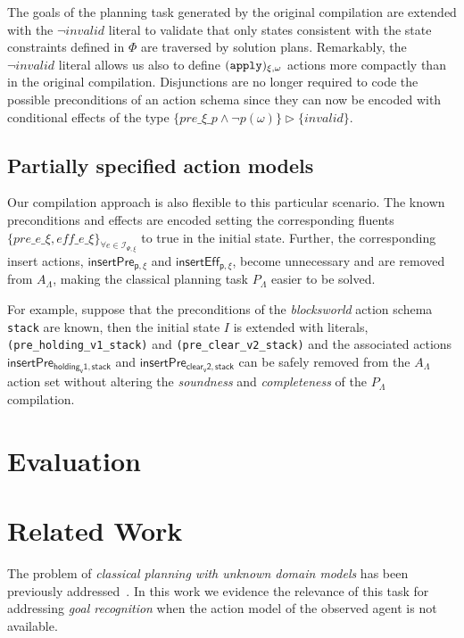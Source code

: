 \documentclass[letterpaper]{article} %
\begin{document}
The goals of the planning task generated by the original compilation are extended with the $\neg invalid$ literal to validate that only states consistent with the state constraints defined in $\Phi$ are traversed by solution plans. Remarkably, the $\neg invalid$ literal allows us also to define ${\tt \small (apply)_{\xi,\omega}}$ actions more compactly than in the original compilation. Disjunctions are no longer required to code the possible preconditions of an action schema since they can now be encoded with conditional effects of the type $\{pre\_\xi\_p\wedge \neg p(\omega)\}\rhd\{invalid\}$.


\subsection{Partially specified action models}
Our compilation approach is also flexible to this particular scenario. The known preconditions and effects are encoded setting the corresponding fluents $\{pre\_e\_\xi, eff\_e\_\xi\}_{\forall e\in{\mathcal I}_{\Psi,\xi}}$ to true in the initial state. Further, the corresponding insert actions, $\mathsf{insertPre_{p,\xi}}$ and $\mathsf{insertEff_{p,\xi}}$, become unnecessary and are removed from $A_{\Lambda}$, making the classical planning task $P_{\Lambda}$ easier to be solved.

For example, suppose that the preconditions of the {\em blocksworld} action schema {\tt stack} are known, then the initial state $I$ is extended with literals, {\small\tt(pre\_holding\_v1\_stack)} and {\small\tt(pre\_clear\_v2\_stack)} and the associated actions $\mathsf{insertPre_{holding_v1,stack}}$ and $\mathsf{insertPre_{clear_v2,stack}}$ can be safely removed from the $A_{\Lambda}$ action set without altering the {\em soundness} and {\em completeness} of the $P_{\Lambda}$ compilation.
















\section{Evaluation}
\label{sec:evaluation}

\section{Related Work}
\label{sec:evaluation}
The problem of {\em classical planning with unknown domain models} has been previously addressed~\cite{SternJ17}. In this work we evidence the relevance of this task for addressing {\em goal recognition} when the action model of the observed agent is not available.   
\end{document}
